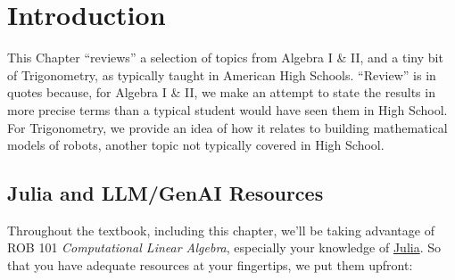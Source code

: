 \newpage


\section{Introduction} 

This Chapter ``reviews'' a selection of topics from Algebra I \& II, and a tiny bit of Trigonometry, as typically taught in American High Schools. ``Review'' is in quotes because, for Algebra I \& II, we make an attempt to state the results in more precise terms than a typical student would have seen them in High School. For Trigonometry, we provide an idea of how it relates to building mathematical models of robots, another topic not typically covered in High School. 


\subsection{Julia and LLM/GenAI Resources}
Throughout the textbook, including this chapter, we'll be taking advantage of ROB 101 \textit{Computational Linear Algebra}, especially your knowledge of \href{https://julialang.org/}{Julia}. So that you have adequate resources at your fingertips, we put them upfront:
